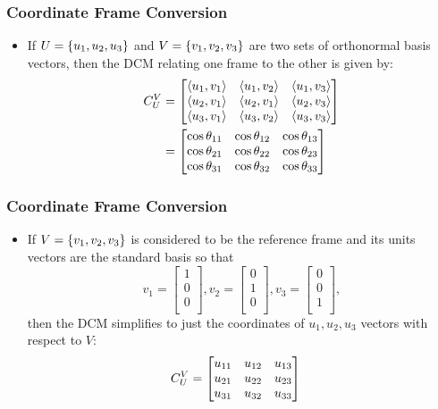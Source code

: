 \begin{frame}
\frametitle{Coordinate Frame Conversion}
\begin{itemize}
  \item If $U=\left\{u_1,u_2,u_3\right\}$ and $V=\left\{v_1,v_2,v_3\right\}$ are two sets of orthonormal basis vectors, then the DCM relating one frame to the other is given by:
\begin{align*}
C_{U}^{V}&=
\begin{bmatrix}
\left<u_1,v_1\right> & \left<u_1,v_2\right> & \left<u_1,v_3\right>\\
\left<u_2,v_1\right> & \left<u_2,v_1\right> & \left<u_2,v_3\right>\\
\left<u_3,v_1\right> & \left<u_3,v_2\right> & \left<u_3,v_3\right>\\
\end{bmatrix}\\
&=
\begin{bmatrix}
\cos\theta_{11} & \cos\theta_{12} & \cos\theta_{13}\\
\cos\theta_{21} & \cos\theta_{22} & \cos\theta_{23}\\
\cos\theta_{31} & \cos\theta_{32} & \cos\theta_{33}\\
\end{bmatrix}
\end{align*}
\end{itemize} 
\end{frame}

\begin{frame}
\frametitle{Coordinate Frame Conversion}
\begin{itemize}
  \item If $V=\left\{v_1,v_2,v_3\right\}$ is considered to be the reference frame and its units vectors are the standard basis so that 
\[
v_1=\begin{bmatrix}
	1\\
	0\\
	0\\
	\end{bmatrix},
v_2=\begin{bmatrix}
	0\\
	1\\
	0\\
	\end{bmatrix},
v_3=\begin{bmatrix}
	0\\
	0\\
	1\\
	\end{bmatrix},
\]
then the DCM simplifies to just the coordinates of $u_1,u_2,u_3$ vectors with respect to $V$:
\begin{align*}
C_{U}^{V}&=
\begin{bmatrix}
u_{11}& u_{12} & u_{13}\\
u_{21} & u_{22} & u_{23}\\
u_{31} & u_{32} & u_{33}\\
\end{bmatrix}
\end{align*}
\end{itemize} 
\end{frame}



